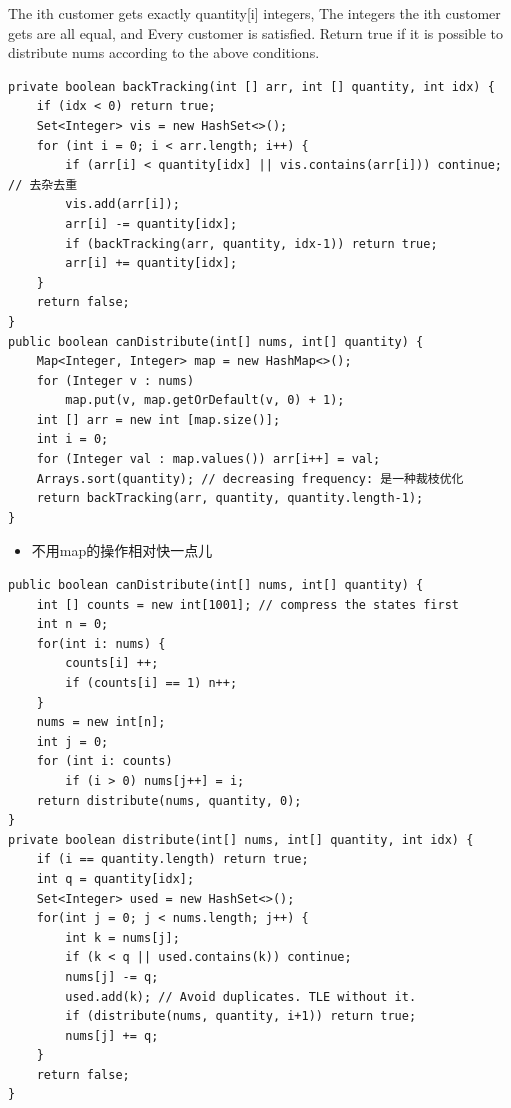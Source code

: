 \documentclass[9pt, b5paaper]{book}
\begin{document}
The ith customer gets exactly quantity[i] integers,
The integers the ith customer gets are all equal, and
Every customer is satisfied.
Return true if it is possible to distribute nums according to the above conditions.
\begin{verbatim}
private boolean backTracking(int [] arr, int [] quantity, int idx) {
    if (idx < 0) return true;
    Set<Integer> vis = new HashSet<>();
    for (int i = 0; i < arr.length; i++) {
        if (arr[i] < quantity[idx] || vis.contains(arr[i])) continue; // 去杂去重
        vis.add(arr[i]);
        arr[i] -= quantity[idx];
        if (backTracking(arr, quantity, idx-1)) return true;
        arr[i] += quantity[idx];
    }
    return false;
}
public boolean canDistribute(int[] nums, int[] quantity) {
    Map<Integer, Integer> map = new HashMap<>();
    for (Integer v : nums) 
        map.put(v, map.getOrDefault(v, 0) + 1);
    int [] arr = new int [map.size()];
    int i = 0;
    for (Integer val : map.values()) arr[i++] = val;
    Arrays.sort(quantity); // decreasing frequency: 是一种裁枝优化
    return backTracking(arr, quantity, quantity.length-1);
}
\end{verbatim}
\begin{itemize}
\item 不用map的操作相对快一点儿
\end{itemize}
\begin{verbatim}
public boolean canDistribute(int[] nums, int[] quantity) {
    int [] counts = new int[1001]; // compress the states first
    int n = 0;
    for(int i: nums) {
        counts[i] ++;
        if (counts[i] == 1) n++;
    }
    nums = new int[n];
    int j = 0;
    for (int i: counts) 
        if (i > 0) nums[j++] = i;
    return distribute(nums, quantity, 0);
}
private boolean distribute(int[] nums, int[] quantity, int idx) {
    if (i == quantity.length) return true;
    int q = quantity[idx];
    Set<Integer> used = new HashSet<>();
    for(int j = 0; j < nums.length; j++) {
        int k = nums[j];
        if (k < q || used.contains(k)) continue;
        nums[j] -= q;
        used.add(k); // Avoid duplicates. TLE without it.
        if (distribute(nums, quantity, i+1)) return true;
        nums[j] += q;
    }
    return false;
}
\end{verbatim}
\end{document}
